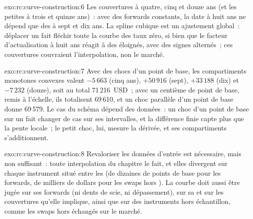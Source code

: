 \begin{solution}{exo:rc:curve-construction:6}
Les couvertures à quatre, cinq et douze ans (et les petites à trois et quinze
ans)~: avec des forwards constants, la date à huit ans ne dépend que des  à
sept et dix ans. La spline cubique est un ajustement global~: déplacer un  fait
fléchir toute la courbe des taux zéro, si bien que le facteur d'actualisation à huit ans
réagit à des  éloignés, avec des signes alternés~; ces couvertures couvraient l'interpolation, non le marché.
\end{solution}

\begin{solution}{exo:rc:curve-construction:7}
Avec des chocs d'un point de base, les compartiments monotones convexes valent $-5\,663$ (cinq
ans), $+50\,916$ (sept), $+33\,188$ (dix) et $-7\,232$ (douze), soit au total
71\,216~USD~; avec un centième de point de base, remis à l'échelle, ils totalisent 69\,610,
et un choc parallèle d'un point de base donne 69\,579. Le cas du schéma dépend
des données~: un choc d'un point de base sur un  fait changer de cas sur ses intervalles,
et la différence finie capte plus que la pente locale~; le petit choc, lui, mesure la dérivée,
et ses compartiments s'additionnent.
\end{solution}

\begin{solution}{exo:rc:curve-construction:8}
Revaloriser les données d'entrée est nécessaire, mais non suffisant~: toute interpolation du
chapitre le fait, et elles divergent sur chaque instrument situé entre les  (de dizaines
de points de base pour les forwards, de milliers de dollars pour les swaps hors ).
La courbe doit aussi être jugée sur ses forwards (ni dents de scie, ni dépassement), sur sa
 et sur les couvertures qu'elle implique, ainsi que sur des instruments
hors échantillon, comme les swaps hors  échangés sur le marché.
\end{solution}

